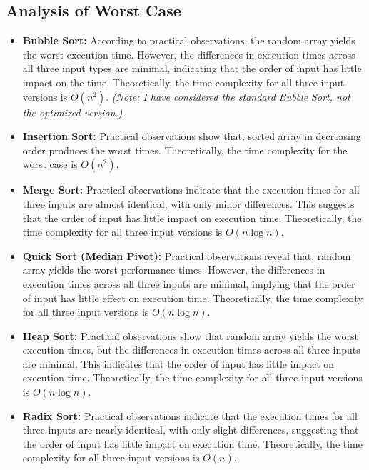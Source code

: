 \documentclass[a4paper,12pt]{report}
\begin{document}
\subsection{Analysis of Worst Case}
\begin{itemize}
    \item \textbf{Bubble Sort:} According to practical observations, the random array yields the worst execution time. However, the differences in execution times across all three input types are minimal, indicating that the order of input has little impact on the time. Theoretically, the time complexity for all three input versions is \(O(n^2)\). \emph{(Note: I have considered the standard Bubble Sort, not the optimized version.)}
    
    \item \textbf{Insertion Sort:} Practical observations show that, sorted array in decreasing order produces the worst times. Theoretically, the time complexity for the worst case is \( O(n^2) \).
    
    \item \textbf{Merge Sort:} Practical observations indicate that the execution times for all three inputs are almost identical, with only minor differences. This suggests that the order of input has little impact on execution time. Theoretically, the time complexity for all three input versions is \(O(n \log n)\).
    
    \item \textbf{Quick Sort (Median Pivot):} Practical observations reveal that, random array yields the worst performance times. However, the differences in execution times across all three inputs are minimal, implying that the order of input has little effect on execution time. Theoretically, the time complexity for all three input versions is \(O(n \log n)\).
    
    \item \textbf{Heap Sort:} Practical observations show that random array yields the worst execution times, but the differences in execution times across all three inputs are minimal. This indicates that the order of input has little impact on execution time. Theoretically, the time complexity for all three input versions is \(O(n \log n)\).
    
    \item \textbf{Radix Sort:} Practical observations indicate that the execution times for all three inputs are nearly identical, with only slight differences, suggesting that the order of input has little impact on execution time. Theoretically, the time complexity for all three input versions is \(O(n)\).
\end{itemize}
\end{document}
